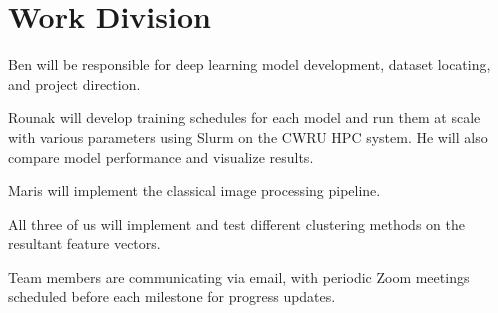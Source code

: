 \documentclass[12pt]{article}
\begin{document}
\section{Work Division}
Ben will be responsible for deep learning model development, dataset locating, and project direction.

Rounak will develop training schedules for each model and run them at scale with various parameters using Slurm on the CWRU HPC system. He will also compare model performance and visualize results.

Maris will implement the classical image processing pipeline.

All three of us will implement and test different clustering methods on the resultant feature vectors.

Team members are communicating via email, with periodic Zoom meetings scheduled before each milestone for progress updates.


\end{document}
